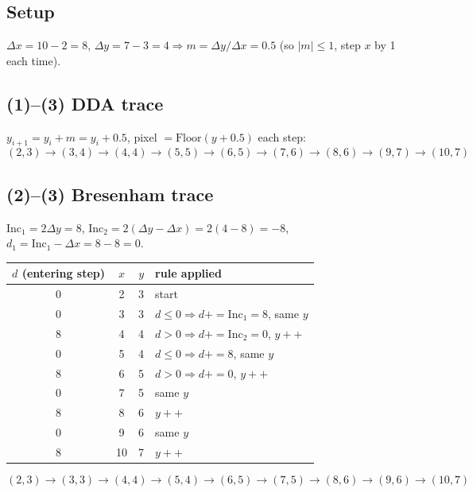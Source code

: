 \documentclass[12pt, a4paper]{article}
\newenvironment{solutionbox}{\begin{mdframed}[style=solutionframe]}{\end{mdframed}}
\newenvironment{answerbox}{\begin{mdframed}[style=answerframe]}{\end{mdframed}}
\begin{document}
\subsection*{Setup}
$\Delta x = 10-2=8$, $\Delta y=7-3=4 \Rightarrow m = \Delta y/\Delta x = 0.5$ (so $|m|\le1$, step $x$ by 1 each time).

\subsection*{(1)--(3) DDA trace}
\begin{answerbox}
$y_{i+1}=y_i+m=y_i+0.5$, pixel $=\mathrm{Floor}(y+0.5)$ each step:
$$(2,3)\to(3,4)\to(4,4)\to(5,5)\to(6,5)\to(7,6)\to(8,6)\to(9,7)\to(10,7)$$
\end{answerbox}

\subsection*{(2)--(3) Bresenham trace}
\begin{solutionbox}
$\mathrm{Inc}_1=2\Delta y=8$, $\mathrm{Inc}_2=2(\Delta y-\Delta x)=2(4-8)=-8$, $d_1=\mathrm{Inc}_1-\Delta x = 8-8=0$.
\begin{center}
\begin{tabular}{cccl}
\toprule
$d$ (entering step) & $x$ & $y$ & rule applied \\
\midrule
0  & 2  & 3 & start \\
0  & 3  & 3 & $d\le0\Rightarrow d{+}{=}\mathrm{Inc}_1=8$, same $y$ \\
8  & 4  & 4 & $d>0\Rightarrow d{+}{=}\mathrm{Inc}_2=0$, $y{+}{+}$ \\
0  & 5  & 4 & $d\le0\Rightarrow d{+}{=}8$, same $y$ \\
8  & 6  & 5 & $d>0\Rightarrow d{+}{=}0$, $y{+}{+}$ \\
0  & 7  & 5 & same $y$ \\
8  & 8  & 6 & $y{+}{+}$ \\
0  & 9  & 6 & same $y$ \\
8  & 10 & 7 & $y{+}{+}$ \\
\bottomrule
\end{tabular}
\end{center}
\end{solutionbox}
\begin{answerbox}
$$(2,3)\to(3,3)\to(4,4)\to(5,4)\to(6,5)\to(7,5)\to(8,6)\to(9,6)\to(10,7)$$
\end{answerbox}
\end{document}

